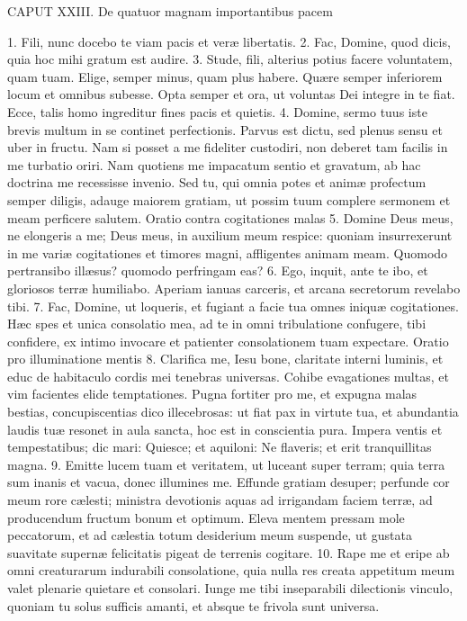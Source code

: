 \documentclass[twoside]{article}
\begin{document}
CAPUT XXIII.
De quatuor magnam importantibus pacem

1. Fili, nunc docebo te viam pacis et veræ libertatis.
2. Fac, Domine, quod dicis, quia hoc mihi gratum est audire.
3. Stude, fili, alterius potius facere voluntatem, quam tuam. Elige, semper minus, quam plus habere. Quære semper inferiorem locum et omnibus subesse. Opta semper et ora, ut voluntas Dei integre in te fiat. Ecce, talis homo ingreditur fines pacis et quietis.
4. Domine, sermo tuus iste brevis multum in se continet perfectionis. Parvus est dictu, sed plenus sensu et uber in fructu. Nam si posset a me fideliter custodiri, non deberet tam facilis in me turbatio oriri. Nam quotiens me impacatum sentio et gravatum, ab hac doctrina me recessisse invenio. Sed tu, qui omnia potes et animæ profectum semper diligis, adauge maiorem gratiam, ut possim tuum complere sermonem et meam perficere salutem.
Oratio contra cogitationes malas
5. Domine Deus meus, ne elongeris a me; Deus meus, in auxilium meum respice: quoniam insurrexerunt in me variæ cogitationes et timores magni, affligentes animam meam. Quomodo pertransibo illæsus? quomodo perfringam eas?
6. Ego, inquit, ante te ibo, et gloriosos terræ humiliabo. Aperiam ianuas carceris, et arcana secretorum revelabo tibi.
7. Fac, Domine, ut loqueris, et fugiant a facie tua omnes iniquæ cogitationes. Hæc spes et unica consolatio mea, ad te in omni tribulatione confugere, tibi confidere, ex intimo invocare et patienter consolationem tuam expectare.
Oratio pro illuminatione mentis
8. Clarifica me, Iesu bone, claritate interni luminis, et educ de habitaculo cordis mei tenebras universas. Cohibe evagationes multas, et vim facientes elide temptationes. Pugna fortiter pro me, et expugna malas bestias, concupiscentias dico illecebrosas: ut fiat pax in virtute tua, et abundantia laudis tuæ resonet in aula sancta, hoc est in conscientia pura. Impera ventis et tempestatibus; dic mari: Quiesce; et aquiloni: Ne flaveris; et erit tranquillitas magna.
9. Emitte lucem tuam et veritatem, ut luceant super terram; quia terra sum inanis et vacua, donec illumines me. Effunde gratiam desuper; perfunde cor meum rore cælesti; ministra devotionis aquas ad irrigandam faciem terræ, ad producendum fructum bonum et optimum. Eleva mentem pressam mole peccatorum, et ad cælestia totum desiderium meum suspende, ut gustata suavitate supernæ felicitatis pigeat de terrenis cogitare.
10. Rape me et eripe ab omni creaturarum indurabili consolatione, quia nulla res creata appetitum meum valet plenarie quietare et consolari. Iunge me tibi inseparabili dilectionis vinculo, quoniam tu solus sufficis amanti, et absque te frivola sunt universa.
\end{document}
